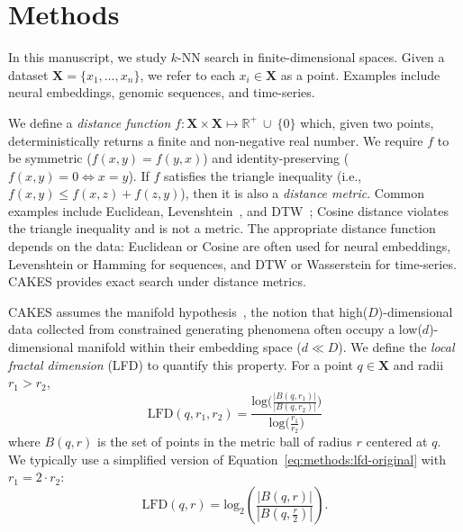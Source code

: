 \section{Methods}
\label{sec:methods}

In this manuscript, we study $k$-NN search in finite-dimensional spaces.
Given a dataset $\textbf{X} = \{x_1, \dots, x_n\}$, we refer to each $x_i \in \textbf{X}$ as a point.
Examples include neural embeddings, genomic sequences, and time-series.

We define a \textit{distance function} $f : \textbf{X} \times \textbf{X} \mapsto \mathbb{R}^+ \ \cup \ \{0\}$ which, given two points, deterministically returns a finite and non-negative real number.
We require $f$ to be symmetric ($f(x, y) = f(y, x)$) and identity-preserving ($f(x, y) = 0 \iff x = y$).
If $f$ satisfies the triangle inequality (i.e.,\,$f(x, y) \leq f(x, z) + f(z, y)$), then it is also a \textit{distance metric}.
Common examples include Euclidean, Levenshtein~\cite{levenshtein1966binary}, and DTW~\cite{muller2007dynamic};
Cosine distance violates the triangle inequality and is not a metric.
The appropriate distance function depends on the data: Euclidean or Cosine are often used for neural embeddings, Levenshtein or Hamming for sequences, and DTW or Wasserstein for time-series.
CAKES provides exact search under distance metrics.

CAKES assumes the manifold hypothesis~\cite{fefferman2016testing}, the notion that high($D$)-dimensional data collected from constrained generating phenomena often occupy a low($d$)-dimensional manifold within their embedding space ($d \ll D$).
We define the \emph{local fractal dimension} (LFD) to quantify this property.
For a point $q \in \textbf{X}$ and radii $r_1 > r_2$,
\begin{equation}
    \text{LFD}(q, r_1, r_2) = \frac{\text{log} \Big( \frac{|B(q, r_1)|}{|B(q, r_2)|} \Big) }{\text{log} \big( \frac{r_1}{r_2} \big) }
    \label{eq:methods:lfd-original}
\end{equation}
where $B(q, r)$ is the set of points in the metric ball of radius $r$ centered at $q$.
We typically use a simplified version of Equation~\ref{eq:methods:lfd-original} with $r_1 = 2 \cdot r_2$:
\begin{equation}
    \text{LFD}(q, r) = \text{log}_2 \left( \frac{|B(q, r)|}{|B(q, \frac{r}{2})|} \right).
    \label{eq:methods:lfd-half}
\end{equation}


